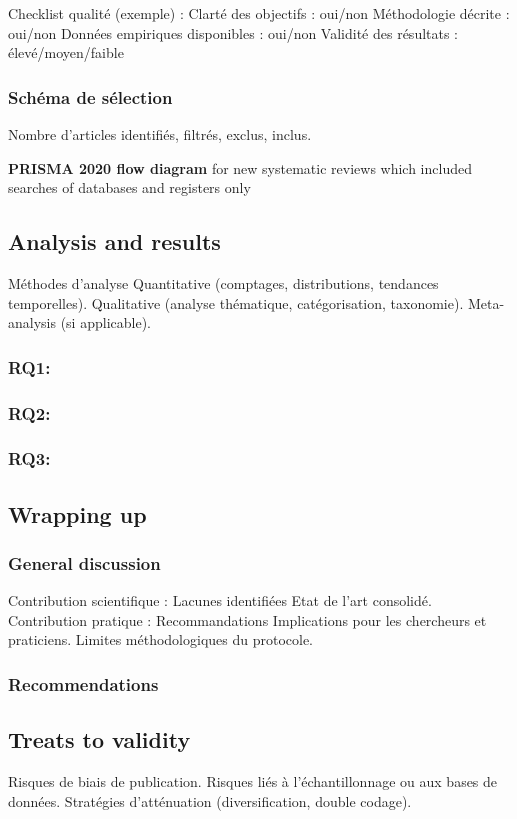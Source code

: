 \documentclass[a4paper,12pt]{article}
\begin{document}
Checklist qualité (exemple) :
    Clarté des objectifs : oui/non
    Méthodologie décrite : oui/non
    Données empiriques disponibles : oui/non
    Validité des résultats : élevé/moyen/faible
\subsubsection{Schéma de sélection}
\label{sec:org1b14340}
Nombre d’articles identifiés, filtrés, exclus, inclus.

\textbf{PRISMA 2020 flow diagram} for new systematic reviews which included searches of databases and registers only
\subsection{Analysis and results}
\label{sec:orgca76882}
Méthodes d’analyse
    Quantitative (comptages, distributions, tendances temporelles).
    Qualitative (analyse thématique, catégorisation, taxonomie).
    Meta-analysis (si applicable).
\subsubsection{RQ1:}
\label{sec:org254a807}
\subsubsection{RQ2:}
\label{sec:orgfe09c39}
\subsubsection{RQ3:}
\label{sec:org1a4e7d3}
\subsection{Wrapping up}
\label{sec:org479158c}
\subsubsection{General discussion}
\label{sec:org6d7f504}
Contribution scientifique :
    Lacunes identifiées
    Etat de l’art consolidé.
Contribution pratique :
    Recommandations
    Implications pour les chercheurs et praticiens.
Limites méthodologiques du protocole.
\subsubsection{Recommendations}
\label{sec:org6467141}
\subsection{Treats to validity}
\label{sec:org121a95f}
Risques de biais de publication.
Risques liés à l’échantillonnage ou aux bases de données.
Stratégies d’atténuation (diversification, double codage).
\end{document}
